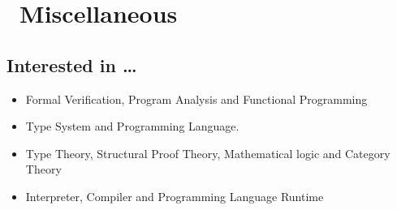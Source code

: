 \documentclass{resume}
\begin{document}

\section{\faInfo\ Miscellaneous}


\subsection{\textbf{Interested in …}}
\begin{itemize}
\item Formal Verification, Program Analysis and Functional Programming
\item Type System and Programming Language. 
\item Type Theory, Structural Proof Theory, Mathematical logic and Category Theory
\item Interpreter, Compiler and Programming Language Runtime 
\end{itemize}

%
%
\end{document}
